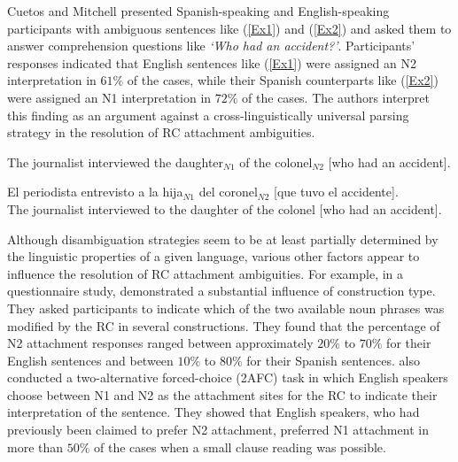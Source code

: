 \documentclass[11pt]{article}\usepackage[]{graphicx}\usepackage[]{color}
\begin{document}
Cuetos and Mitchell presented Spanish-speaking and English-speaking participants with ambiguous sentences like (\ref{Ex1}) and (\ref{Ex2}) and asked them to answer comprehension questions like \textit{`Who had an accident?'}. Participants' responses indicated that English sentences like (\ref{Ex1}) were assigned an N2 interpretation in $61\%$ of the cases, while their Spanish counterparts like (\ref{Ex2}) were assigned an N1 interpretation in $72\%$ of the cases. The authors interpret this finding as an argument against a cross-linguistically universal parsing strategy in the resolution of RC attachment ambiguities.

\begin{exe}
\ex \label{Ex1} The journalist interviewed the daughter$_{N1}$ of the colonel$_{N2}$ [who had an accident].
\end{exe}

\begin{exe}
\ex \label{Ex2} 
\gll El periodista entrevisto a la hija$_{N1}$ del coronel$_{N2}$ [que tuvo el accidente]. \\
     The journalist interviewed to the daughter {of the} colonel [who had an accident]. \\
\end{exe}

Although disambiguation strategies seem to be at least partially determined by the linguistic properties of a given language, various other factors appear to influence the resolution of RC attachment ambiguities.
For example, in a questionnaire study, \citet[inter alia]{GilboyEtAl:1995} demonstrated a substantial influence of construction type. They asked participants to indicate which of the two available noun phrases was modified by the RC in several constructions. They found that the percentage of N2 attachment responses ranged between approximately $20\%$ to $70\%$ for their English sentences and between $10\%$ to $80\%$ for their Spanish sentences. \citet{GrilloEtAl:2015} also conducted a two-alternative forced-choice (2AFC) task in which English speakers choose between N1 and N2 as the attachment sites for the RC to indicate their interpretation of the sentence. They showed that English speakers, who had previously been claimed to prefer N2 attachment, preferred N1 attachment in more than $50\%$ of the cases when a small clause reading was possible.
\end{document}
